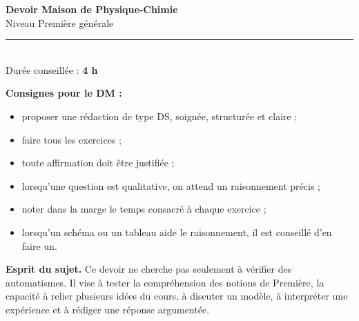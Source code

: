 \documentclass[11pt,a4paper]{article}
\begin{document}
\begin{center}
    {\Huge \bfseries \color{bleufonce} Devoir Maison de Physique-Chimie}\\[0.4em]
    {\Large Niveau Première générale}\\[0.4em]
    \rule{0.7\linewidth}{0.6pt}\\[0.4em]
    Durée conseillée : \textbf{4 h}
\end{center}

\begin{consignesbox}
\textbf{Consignes pour le DM :}
\begin{itemize}[label=---]
    \item proposer une rédaction de type DS, soignée, structurée et claire ;
    \item faire tous les exercices ;
    \item toute affirmation doit être justifiée ;
    \item lorsqu’une question est qualitative, on attend un raisonnement précis ;
    \item noter dans la marge le temps consacré à chaque exercice ;
    \item lorsqu’un schéma ou un tableau aide le raisonnement, il est conseillé d’en faire un.
\end{itemize}
\end{consignesbox}

\begin{espritbox}
\textbf{Esprit du sujet.} Ce devoir ne cherche pas seulement à vérifier des automatismes. Il vise à tester la compréhension des notions de Première, la capacité à relier plusieurs idées du cours, à discuter un modèle, à interpréter une expérience et à rédiger une réponse argumentée.
\end{espritbox}
\end{document}
